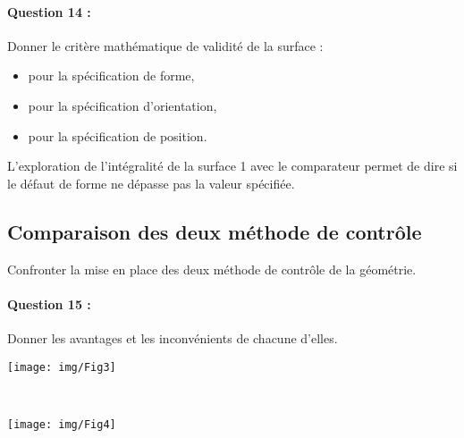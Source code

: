 \paragraph{Question 14 :} Donner le critère mathématique de validité de la surface :
\begin{itemize}
 \item pour la spécification de forme,
 \item pour la spécification d'orientation,
 \item pour la spécification de position.
\end{itemize}

L'exploration de l'intégralité de la surface 1 avec le comparateur permet de dire si le défaut de forme ne dépasse pas la valeur spécifiée.

\subsection{Comparaison des deux méthode de contrôle}

Confronter la mise en place des deux méthode de contrôle de la géométrie.

\paragraph{Question 15 :} Donner les avantages et les inconvénients de chacune d'elles.

\newpage

\centering\texttt{[image: img/Fig3]}

~\

\centering\texttt{[image: img/Fig4]}


